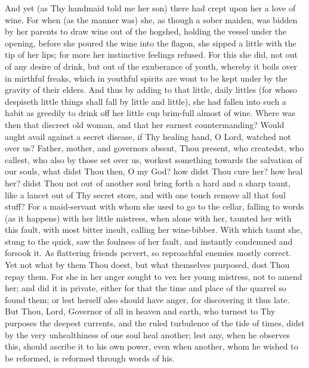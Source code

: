 \documentclass[b5paper,openright,12pt,twoside]{book}
\begin{document}
And yet (as Thy handmaid told me her son) there had crept upon her
a love of wine. For when (as the manner was) she, as though a sober
maiden, was bidden by her parents to draw wine out of the hogshed,
holding the vessel under the opening, before she poured the wine into
the flagon, she sipped a little with the tip of her lips; for more her
instinctive feelings refused. For this she did, not out of any desire
of drink, but out of the exuberance of youth, whereby it boils over in
mirthful freaks, which in youthful spirits are wont to be kept under by
the gravity of their elders. And thus by adding to that little, daily
littles (for whoso despiseth little things shall fall by little and
little), she had fallen into such a habit as greedily to drink off her
little cup brim-full almost of wine. Where was then that discreet old
woman, and that her earnest countermanding? Would aught avail against
a secret disease, if Thy healing hand, O Lord, watched not over us?
Father, mother, and governors absent, Thou present, who createdst, who
callest, who also by those set over us, workest something towards the
salvation of our souls, what didst Thou then, O my God? how didst Thou
cure her? how heal her? didst Thou not out of another soul bring forth a
hard and a sharp taunt, like a lancet out of Thy secret store, and with
one touch remove all that foul stuff? For a maid-servant with whom she
used to go to the cellar, falling to words (as it happens) with her
little mistress, when alone with her, taunted her with this fault, with
most bitter insult, calling her wine-bibber. With which taunt she, stung
to the quick, saw the foulness of her fault, and instantly condemned and
forsook it. As flattering friends pervert, so reproachful enemies mostly
correct. Yet not what by them Thou doest, but what themselves purposed,
dost Thou repay them. For she in her anger sought to vex her young
mistress, not to amend her; and did it in private, either for that the
time and place of the quarrel so found them; or lest herself also should
have anger, for discovering it thus late. But Thou, Lord, Governor
of all in heaven and earth, who turnest to Thy purposes the deepest
currents, and the ruled turbulence of the tide of times, didst by the
very unhealthiness of one soul heal another; lest any, when he observes
this, should ascribe it to his own power, even when another, whom he
wished to be reformed, is reformed through words of his.
\end{document}
